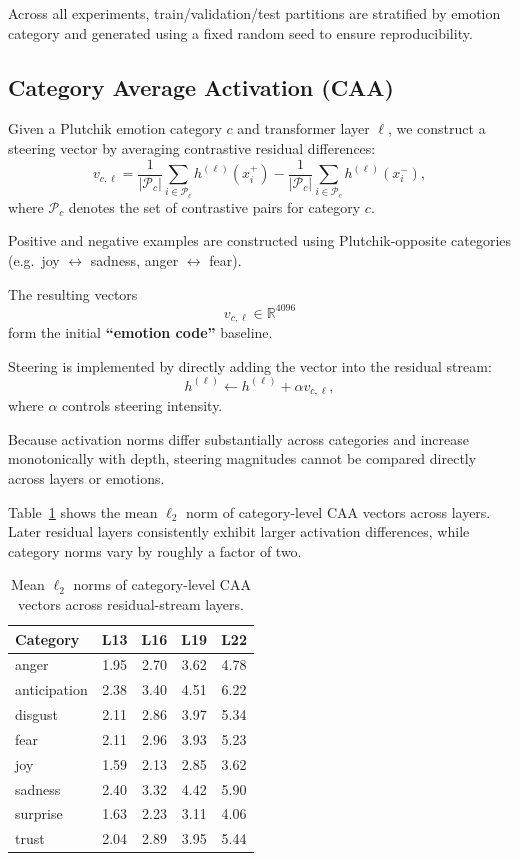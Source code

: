 \documentclass[12pt,twoside]{report}
\begin{document}
Across all experiments, train/validation/test partitions are stratified by emotion category and generated using a fixed random seed to ensure
reproducibility.

\subsection{Category Average Activation (CAA)}
\label{sec:emotion_code:caa:definition}

Given a Plutchik emotion category $c$ and transformer layer $\ell$, we
construct a steering vector by averaging contrastive residual
differences:
\begin{equation}
v_{c,\ell}
=
\frac{1}{|\mathcal{P}_c|}
\sum_{i\in\mathcal{P}_c}
h^{(\ell)}(x_i^+)
-
\frac{1}{|\mathcal{P}_c|}
\sum_{i\in\mathcal{P}_c}
h^{(\ell)}(x_i^-),
\end{equation}
where $\mathcal{P}_c$ denotes the set of contrastive pairs for category
$c$.

Positive and negative examples are constructed using
Plutchik-opposite categories (e.g.\ joy $\leftrightarrow$ sadness,
anger $\leftrightarrow$ fear).

The resulting vectors
\[
v_{c,\ell}\in\mathbb{R}^{4096}
\]
form the initial \textbf{``emotion code''} baseline.

Steering is implemented by directly adding the vector into the residual
stream:
\begin{equation}
h^{(\ell)}
\leftarrow
h^{(\ell)} + \alpha v_{c,\ell},
\end{equation}
where $\alpha$ controls steering intensity.

Because activation norms differ substantially across categories and increase monotonically with depth, steering magnitudes cannot be compared directly across layers or emotions.

Table~\ref{tab:caa-norms} shows the mean $\ell_2$ norm of category-level CAA vectors across layers. Later residual layers consistently exhibit larger activation differences, while category norms vary by roughly a factor of two.

\begin{table}[H]
\centering
\begin{tabular}{lcccc}
\toprule
Category & L13 & L16 & L19 & L22 \\
\midrule
anger        & 1.95 & 2.70 & 3.62 & 4.78 \\
anticipation & 2.38 & 3.40 & 4.51 & 6.22 \\
disgust      & 2.11 & 2.86 & 3.97 & 5.34 \\
fear         & 2.11 & 2.96 & 3.93 & 5.23 \\
joy          & 1.59 & 2.13 & 2.85 & 3.62 \\
sadness      & 2.40 & 3.32 & 4.42 & 5.90 \\
surprise     & 1.63 & 2.23 & 3.11 & 4.06 \\
trust        & 2.04 & 2.89 & 3.95 & 5.44 \\
\bottomrule
\end{tabular}
\caption{Mean $\ell_2$ norms of category-level CAA vectors across residual-stream layers.}
\label{tab:caa-norms}
\end{table}
\end{document}
